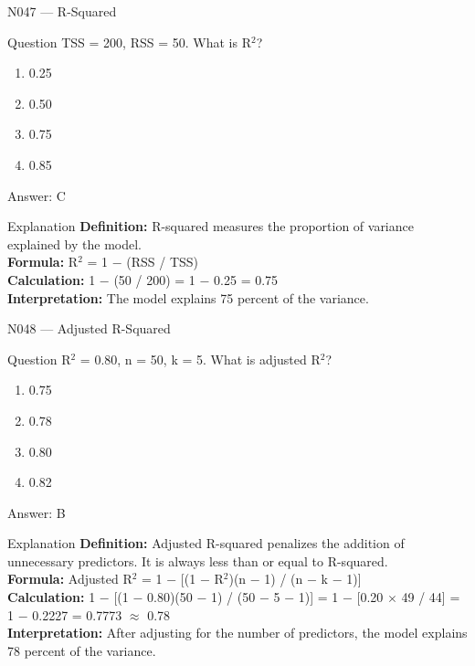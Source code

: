 \documentclass[aspectratio=169,8pt]{beamer}
\begin{document}
	\begin{frame}{N047 --- R-Squared}
		\begin{block}{Question}
			TSS = 200, RSS = 50. What is R$^{2}$?
			\begin{enumerate}
				\item 0.25
				\item 0.50
				\item 0.75
				\item 0.85
			\end{enumerate}
		\end{block}
		\begin{exampleblock}{Answer: C}\end{exampleblock}
		\begin{block}{Explanation}
			\textbf{Definition:} R-squared measures the proportion of variance explained by the model.\\
			\textbf{Formula:} R$^{2}$ = 1 $-$ (RSS / TSS)\\
			\textbf{Calculation:} 1 $-$ (50 / 200) = 1 $-$ 0.25 = 0.75\\
			\textbf{Interpretation:} The model explains 75 percent of the variance.
		\end{block}
	\end{frame}
	
	\begin{frame}{N048 --- Adjusted R-Squared}
		\begin{block}{Question}
			R$^{2}$ = 0.80, n = 50, k = 5. What is adjusted R$^{2}$?
			\begin{enumerate}
				\item 0.75
				\item 0.78
				\item 0.80
				\item 0.82
			\end{enumerate}
		\end{block}
		\begin{exampleblock}{Answer: B}\end{exampleblock}
		\begin{block}{Explanation}
			\textbf{Definition:} Adjusted R-squared penalizes the addition of unnecessary predictors. It is always less than or equal to R-squared.\\
			\textbf{Formula:} Adjusted R$^{2}$ = 1 $-$ [(1 $-$ R$^{2}$)(n $-$ 1) / (n $-$ k $-$ 1)]\\
			\textbf{Calculation:} 1 $-$ [(1 $-$ 0.80)(50 $-$ 1) / (50 $-$ 5 $-$ 1)] = 1 $-$ [0.20 $\times$ 49 / 44] = 1 $-$ 0.2227 = 0.7773 $\approx$ 0.78\\
			\textbf{Interpretation:} After adjusting for the number of predictors, the model explains 78 percent of the variance.
		\end{block}
	\end{frame}
	
\end{document}
